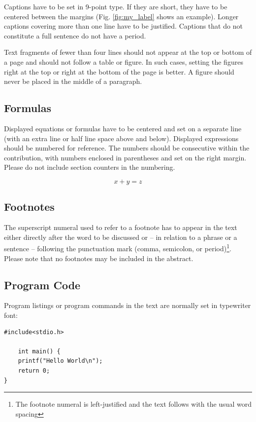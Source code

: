 \documentclass{llncs}
\begin{document}
Captions have to be set in 9-point type. If they are short, they have to be centered between the margins (Fig. \ref{fig:my_label} shows an example). Longer captions covering more than one line have to be justified. Captions that do not constitute a full sentence do not have a period.

Text fragments of fewer than four lines should not appear at the top or bottom of a page and should not follow a table or figure. In such cases, setting the figures right at the top or right at the bottom of the page is better. A figure should never be placed in the middle of a paragraph.

\subsection{Formulas}
Displayed equations or formulas have to be centered and set on a separate line (with an extra line or half line space above and below). Displayed expressions should be numbered for reference. The numbers should be consecutive within the contribution, with numbers enclosed in parentheses and set on the right margin. Please do not include section counters in the numbering.

\begin{equation}
    x + y = z
\end{equation}

\subsection{Footnotes}

The superscript numeral used to refer to a footnote has to appear in the text either directly after the word to be discussed or – in relation to a phrase or a sentence – following the punctuation mark (comma, semicolon, or period)\footnote{The footnote numeral is left-justified and the text follows with the usual word spacing }.  
Please note that no footnotes may be included in the abstract.

\subsection{Program Code}
Program listings or program commands in the text are normally set in typewriter font: 

\begin{lstlisting}
#include<stdio.h>

    int main() {
	printf("Hello World\n");
	return 0;
}
\end{lstlisting}
\end{document}
